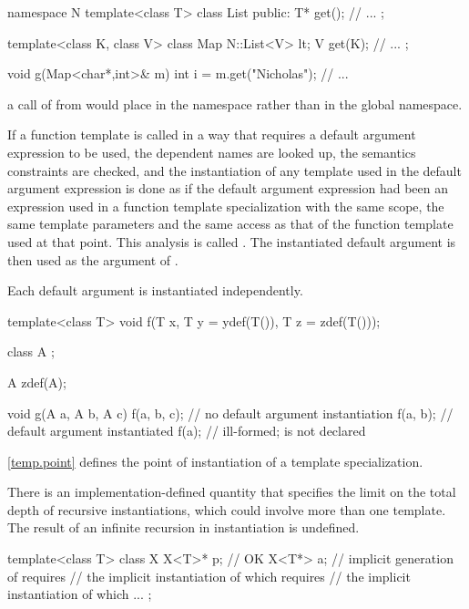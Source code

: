 \begin{codeblock}
namespace N {
	template<class T> class List {
	public:
		T* get();
	// ...
	};
}

template<class K, class V> class Map {
	N::List<V> lt;
	V get(K);
	// ...
};

void g(Map<char*,int>& m)
{
	int i = m.get("Nicholas");
	// ...
}
\end{codeblock}

a call of
from
would place
in the namespace
rather than in the global namespace.
\exitexample

\pnum
If a function template
is called in a way that requires a default argument expression to be used,
the dependent names are looked up, the semantics constraints are checked,
and the instantiation of any template used in the default argument expression
is done as if the default argument expression had been
an expression used in a function template specialization with the same scope,
the same template parameters and the same access as that of the function template
used at that point.
This analysis is called
.
The instantiated default argument is then used as the argument of
.

\pnum
Each default argument is instantiated independently.
\enterexample

\begin{codeblock}
template<class T> void f(T x, T y = ydef(T()), T z = zdef(T()));

class  A { };

A zdef(A);

void g(A a, A b, A c) {
	f(a, b, c);		// no default argument instantiation
	f(a, b);		// default argument  instantiated
	f(a);			// ill-formed;  is not declared
}
\end{codeblock}
\exitexampleb

\pnum
\enternote
\ref{temp.point} defines the point of instantiation of a template specialization.
\exitnote

\pnum
There is an implementation-defined quantity that specifies the limit on
the total depth of recursive instantiations, which could involve more than one
template.
The result of an infinite recursion in instantiation is undefined.
\enterexample

\begin{codeblock}
template<class T> class X {
	X<T>* p;		// OK
	X<T*> a;		// implicit generation of  requires
				// the implicit instantiation of  which requires
				// the implicit instantiation of  which ...
};
\end{codeblock}
\exitexampleb

